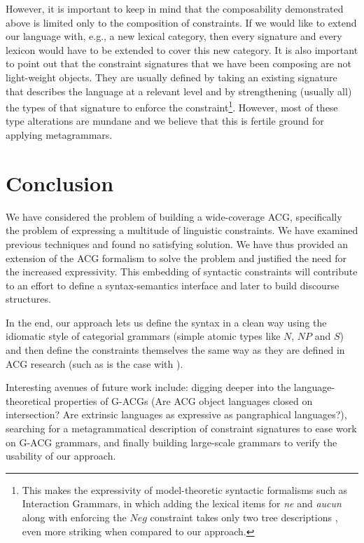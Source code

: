 \documentclass{llncs}
\begin{document}
However, it is important to keep in mind that the composability demonstrated
above is limited only to the composition of constraints. If we would like to
extend our language with, e.g., a new lexical category, then every signature
and every lexicon would have to be extended to cover this new category. It is
also important to point out that the constraint signatures that we have been
composing are not light-weight objects. They are usually defined by taking an
existing signature that describes the language at a relevant level and by
strengthening (usually all) the types of that signature to enforce the
constraint\footnote{This makes the expressivity of model-theoretic syntactic
  formalisms such as Interaction Grammars, in which adding the lexical items
  for \emph{ne} and \emph{aucun} along with enforcing the $Neg$ constraint
  takes only two tree descriptions \cite{perrier2007french}, even more
  striking when compared to our approach.}. However, most of these type
alterations are mundane and we believe that this is fertile ground for
applying metagrammars.


\section{Conclusion}

We have considered the problem of building a wide-coverage ACG, specifically
the problem of expressing a multitude of linguistic constraints. We have
examined previous techniques and found no satisfying solution. We have thus
provided an extension of the ACG formalism to solve the problem and justified
the need for the increased expressivity. This embedding of syntactic
constraints will contribute to an effort to define a syntax-semantics
interface and later to build discourse structures.

In the end, our approach lets us define the syntax in a clean way using the
idiomatic style of categorial grammars (simple atomic types like $N$, $NP$ and
$S$) and then define the constraints themselves the same way as they are
defined in ACG research (such as is the case with
\cite{pogodalla2012controlling}).

Interesting avenues of future work include: digging deeper into the
language-theoretical properties of G-ACGs (Are ACG object languages closed on
intersection? Are extrinsic languages as expressive as pangraphical
languages?), searching for a metagrammatical description of constraint
signatures to ease work on G-ACG grammars, and finally building large-scale
grammars to verify the usability of our approach.


%
%



\end{document}
